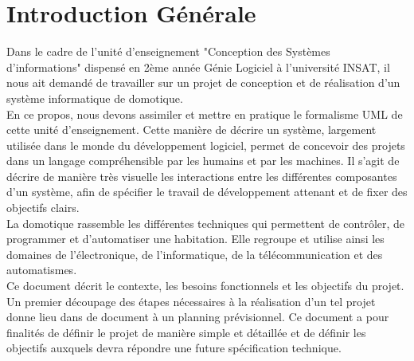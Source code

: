 \chapter*{Introduction Générale}

\begin{spacing}{1.2}

Dans le cadre de l’unité d’enseignement "Conception des Systèmes d’informations" dispensé en 2ème année Génie Logiciel à l’université INSAT, il nous ait demandé de travailler sur un projet de conception et de réalisation d’un système informatique de domotique.\\

En ce propos, nous devons assimiler et mettre en pratique le formalisme UML de cette unité d’enseignement. Cette manière de décrire un système, largement utilisée dans le monde du développement logiciel, permet de concevoir des projets dans un langage compréhensible par les humains et par les machines. Il s’agit de décrire de manière très visuelle les interactions entre les différentes composantes d’un système, afin de spécifier le travail de développement attenant et de fixer des objectifs clairs.\\

La domotique rassemble les différentes techniques qui permettent de contrôler, de programmer et d’automatiser une habitation. Elle regroupe et utilise ainsi les domaines de l’électronique, de l’informatique, de la télécommunication et des automatismes.\\

Ce document décrit le contexte, les besoins fonctionnels et les objectifs du projet. 
Un premier découpage des étapes nécessaires à la réalisation d’un tel projet donne lieu dans de document à un planning prévisionnel. Ce document a pour finalités de définir le projet de manière simple et détaillée et de définir les objectifs auxquels devra répondre une future spécification technique.  \\





\end{spacing}


